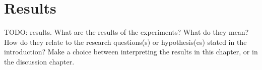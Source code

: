 \chapter{Results}\label{chap:results}

TODO: results. What are the results of the experiments? What do they mean? How do they relate to the research questions(s) or hypothesis(es) stated in the introduction? Make a choice between interpreting the results in this chapter, or in the discussion chapter.
